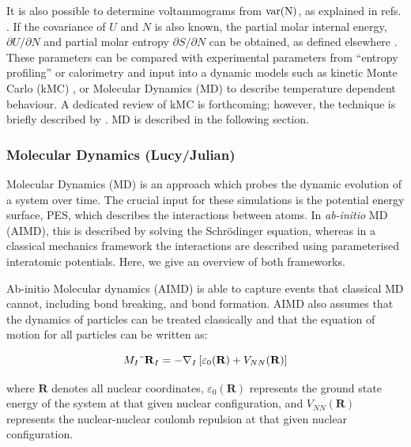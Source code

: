 \documentclass[../main.tex]{subfiles}
\begin{document}
It is also possible to determine voltammograms from $\rm{var}(N)$, as explained in refs. \cite{mercer_influence_2017,darling1999}. If the covariance of $U$ and $N$ is also known, the partial molar internal energy, $\partial{U}/\partial{N}$ and partial molar entropy $\partial{S}/\partial{N}$ can be obtained, as defined elsewhere \cite{mercer_influence_2017,Kim2001ThermodynamicAK}. These parameters can be compared with experimental parameters from ``entropy profiling'' or calorimetry \cite{mercer_influence_2017,schlueter_quantifying_2018,Mercer2019,THOMAS2003844,zhang2017} and input into a dynamic models such as kinetic Monte Carlo (kMC) \cite{gavilan-arriazu_kinetic_2020,darling1999,gavilan-arriazu_effect_2020,persson2010}, or Molecular Dynamics (MD) to describe temperature dependent behaviour. A dedicated review of kMC is forthcoming; however, the technique is briefly described by \citeauthor{VanderVen2020}. \cite{VanderVen2020} MD is described in the following section.

\subsubsection{Molecular Dynamics (Lucy/Julian)}
\label{sec:molecular_dynamics}
Molecular Dynamics (MD) is an approach which probes the dynamic evolution of a system over time. The crucial input for these simulations is the potential energy surface, PES, which describes the interactions between atoms. In \textit{ab-initio} MD (AIMD), this is described by solving the Schr\"{o}dinger equation, whereas in a classical mechanics framework the interactions are described using parameterised interatomic potentials. Here, we give an overview of both frameworks.

Ab-initio Molecular dynamics (AIMD) is able to capture events that classical MD cannot, including bond breaking, and bond formation. AIMD also assumes that the dynamics of particles can be treated classically and that the equation of motion for all particles can be written as:

\begin{equation}
    \label{eq:eom}
    M_I \textrm{\"{\textbf{R}}} _I=-\nabla_I\left[ \varepsilon_0(\textbf{R})+V_{NN}(\mathbf{R})\right]
\end{equation}

where $\textbf{R}$ denotes all nuclear coordinates, $\varepsilon_0(\textbf{R})$ represents the ground state energy of the system at that given nuclear configuration, and $V_{NN}(\textbf{R})$ represents the nuclear-nuclear coulomb repulsion at that given nuclear configuration. 
\end{document}
